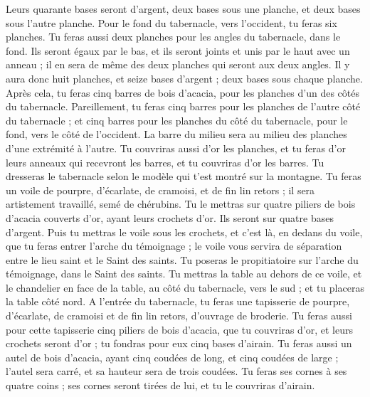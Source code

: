 \begin{multicols}{2}
Leurs quarante bases seront d'argent, deux bases sous une planche, et deux bases sous l'autre planche.
Pour le fond du tabernacle, vers l'occident, tu feras six planches.
Tu feras aussi deux planches pour les angles du tabernacle, dans le fond.
Ils seront égaux par le bas, et ils seront joints et unis par le haut avec un anneau ; il en sera de même des deux planches qui seront aux deux angles.
Il y aura donc huit planches, et seize bases d'argent ; deux bases sous chaque planche.
Après cela, tu feras cinq barres de bois d’acacia, pour les planches d'un des côtés du tabernacle.
Pareillement, tu feras cinq barres pour les planches de l'autre côté du tabernacle ; et cinq barres pour les planches du côté du tabernacle, pour le fond, vers le côté de l'occident.
La barre du milieu sera au milieu des planches d’une extrémité à l’autre.
Tu couvriras aussi d'or les planches, et tu feras d'or leurs anneaux qui recevront les barres, et tu couvriras d'or les barres.
Tu dresseras le tabernacle selon le modèle qui t’est montré sur la montagne.
Tu feras un voile de pourpre, d'écarlate, de cramoisi, et de fin lin retors ; il sera artistement travaillé, semé de chérubins.
Tu le mettras sur quatre piliers de bois d’acacia couverts d'or, ayant leurs crochets d'or. Ils seront sur quatre bases d'argent.
Puis tu mettras le voile sous les crochets, et c’est là, en dedans du voile, que tu feras entrer l'arche du témoignage ; le voile vous servira de séparation entre le lieu saint et le Saint des saints.
Tu poseras le propitiatoire sur l'arche du témoignage, dans le Saint des saints.
Tu mettras la table au dehors de ce voile, et le chandelier en face de la table, au côté du tabernacle, vers le sud ; et tu placeras la table côté nord.
A l'entrée du tabernacle, tu feras une tapisserie de pourpre, d'écarlate, de cramoisi et de fin lin retors, d'ouvrage de broderie.
Tu feras aussi pour cette tapisserie cinq piliers de bois d’acacia, que tu couvriras d'or, et leurs crochets seront d'or ; tu fondras pour eux cinq bases d'airain.
\VerseOne{}Tu feras aussi un autel de bois d’acacia, ayant cinq coudées de long, et cinq coudées de large ; l'autel sera carré, et sa hauteur sera de trois coudées.
Tu feras ses cornes à ses quatre coins ; ses cornes seront tirées de lui, et tu le couvriras d'airain.

\end{multicols}
